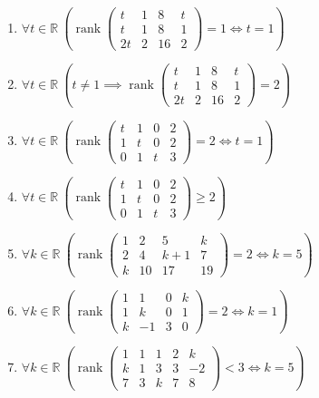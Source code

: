 \documentclass[11pt,a4paper]{article}
\begin{document}
\begin{enumerate}
\item $\displaystyle \forall t \in \mathbb{R}\ \left( \operatorname{rank} \begin{pmatrix} t & 1 & 8 & t \\ t & 1 & 8 & 1 \\ 2t & 2 & 16 & 2 \end{pmatrix} = 1 \iff t = 1 \right)$
\item $\displaystyle \forall t \in \mathbb{R}\ \left( t \neq 1 \implies \operatorname{rank} \begin{pmatrix} t & 1 & 8 & t \\ t & 1 & 8 & 1 \\ 2t & 2 & 16 & 2 \end{pmatrix} = 2 \right)$
\item $\displaystyle \forall t \in \mathbb{R}\ \left( \operatorname{rank} \begin{pmatrix} t & 1 & 0 & 2 \\ 1 & t & 0 & 2 \\ 0 & 1 & t & 3 \end{pmatrix} = 2 \iff t = 1 \right)$
\item $\displaystyle \forall t \in \mathbb{R}\ \left( \operatorname{rank} \begin{pmatrix} t & 1 & 0 & 2 \\ 1 & t & 0 & 2 \\ 0 & 1 & t & 3 \end{pmatrix} \ge 2 \right)$
\item $\displaystyle \forall k \in \mathbb{R}\ \left( \operatorname{rank} \begin{pmatrix} 1 & 2 & 5 & k \\ 2 & 4 & k + 1 & 7 \\ k & 10 & 17 & 19 \end{pmatrix} = 2 \iff k = 5 \right)$
\item $\displaystyle \forall k \in \mathbb{R}\ \left( \operatorname{rank} \begin{pmatrix} 1 & 1 & 0 & k \\ 1 & k & 0 & 1 \\ k & -1 & 3 & 0 \end{pmatrix} = 2 \iff k = 1 \right)$
\item $\displaystyle \forall k \in \mathbb{R}\ \left( \operatorname{rank} \begin{pmatrix} 1 & 1 & 1 & 2 & k \\ k & 1 & 3 & 3 & -2 \\ 7 & 3 & k & 7 & 8 \end{pmatrix} < 3 \iff k = 5 \right)$

\end{enumerate}
\end{document}
